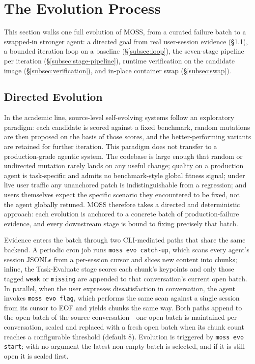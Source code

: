 \section{The Evolution Process}
\label{sec:evolution}

This section walks one full evolution of MOSS, from a curated failure batch to a swapped-in stronger agent: a directed goal from real user-session evidence (\S\ref{subsec:directed}), a bounded iteration loop on a baseline (\S\ref{subsec:loop}), the seven-stage pipeline per iteration (\S\ref{subsec:stage-pipeline}), runtime verification on the candidate image (\S\ref{subsec:verification}), and in-place container swap (\S\ref{subsec:swap}).

\subsection{Directed Evolution}
\label{subsec:directed}

In the academic line, source-level self-evolving systems follow an exploratory paradigm: each candidate is scored against a fixed benchmark, random mutations are then proposed on the basis of those scores, and the better-performing variants are retained for further iteration. This paradigm does not transfer to a production-grade agentic system. The codebase is large enough that random or undirected mutation rarely lands on any useful change; quality on a production agent is task-specific and admits no benchmark-style global fitness signal; under live user traffic any unanchored patch is indistinguishable from a regression; and users themselves expect the specific scenario they encountered to be fixed, not the agent globally retuned. MOSS therefore takes a directed and deterministic approach: each evolution is anchored to a concrete batch of production-failure evidence, and every downstream stage is bound to fixing precisely that batch.

Evidence enters the batch through two CLI-mediated paths that share the same backend. A periodic cron job runs \texttt{moss evo catch-up}, which scans every agent's session JSONLs from a per-session cursor and slices new content into chunks; inline, the Task-Evaluate stage scores each chunk's keypoints and only those tagged \texttt{weak} or \texttt{missing} are appended to that conversation's current open batch. In parallel, when the user expresses dissatisfaction in conversation, the agent invokes \texttt{moss evo flag}, which performs the same scan against a single session from its cursor to EOF and yields chunks the same way. Both paths append to the open batch of the source conversation---one open batch is maintained per conversation, sealed and replaced with a fresh open batch when its chunk count reaches a configurable threshold (default 8). Evolution is triggered by \texttt{moss evo start}; with no argument the latest non-empty batch is selected, and if it is still open it is sealed first.

